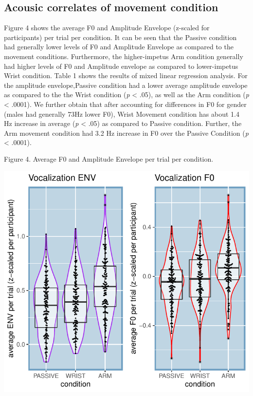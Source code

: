 \documentclass[
  man,floatsintext]{apa6}
\begin{document}
\hypertarget{acousic-correlates-of-movement-condition}{%
\subsection{Acousic correlates of movement condition}\label{acousic-correlates-of-movement-condition}}

Figure 4 shows the average F0 and Amplitude Envelope (z-scaled for participants) per trial per condition. It can be seen that the Passive condition had generally lower levels of F0 and Amplitude Envelope as compared to the movement conditions. Furthermore, the higher-impetus Arm condition generally had higher levels of F0 and Amplitude envelope as compared to lower-impetus Wrist condition.
Table 1 shows the results of mixed linear regression analysis. For the amplitude envelope,Passive condition had a lower average amplitude envelope as compared to the the Wrist condition (\emph{p} \textless{} .05), as well as the Arm condition (\emph{p} \textless{} .0001). We further obtain that after accounting for differences in F0 for gender (males had generally 73Hz lower F0), Wrist Movement condition has about 1.4 Hz increase in average (\emph{p} \textless{} .05) as compared to Passive condition. Further, the Arm movement condition had 3.2 Hz increase in F0 over the Passive Condition (\emph{p} \textless{} .0001).

Figure 4. Average F0 and Amplitude Envelope per trial per condition.

\includegraphics{GS_physics_in_fluid_speech_files/figure-latex/plot_avF0_avENV-1.pdf}
\end{document}
